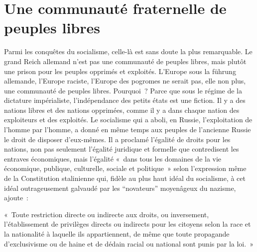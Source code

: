 \documentclass[french,twoside]{book} %
\newenvironment{quoteblock}%
  {\begin{quoting}}
  {\end{quoting}}
\newenvironment{quotebar}{%
    \def\FrameCommand{{\color{rubric!10!}\vrule width 0.5em} \hspace{0.9em}}%
    \def\OuterFrameSep{\itemsep} %
    \MakeFramed {\advance\hsize-\width \FrameRestore}
  }%
  {%
    \endMakeFramed
  }
\renewenvironment{quoteblock}%
  {%
    \savenotes
    \setstretch{0.9}
    \normalfont
    \begin{quotebar}
  }
  {%
    \end{quotebar}
    \spewnotes
  }
\begin{document}
\section[{Une communauté fraternelle de peuples libres}]{Une communauté fraternelle de peuples libres}
\noindent Parmi les conquêtes du socialisme, celle-là est sans doute la plus remarquable. Le grand Reich allemand n’est pas une communauté de peuples libres, mais plutôt une prison pour les peuples opprimés et exploités. L’Europe sous la führung allemande, l’Europe raciste, l’Europe des pogromes ne serait pas, elle non plus, une communauté de peuples libres. Pourquoi ? Parce que sous le régime de la dictature impérialiste, l’indépendance des petits états est une fiction. Il y a des nations libres et des nations opprimées, comme il y a dans chaque nation des exploiteurs et des exploités. Le socialisme qui a aboli, en Russie, l’exploitation de l’homme par l’homme, a donné en même temps aux peuples de l’ancienne Russie le droit de disposer d’eux-mêmes. Il a proclamé l’égalité de droits pour les nations, non pas seulement l’égalité juridique et formelle que contredisent les entraves économiques, mais l’égalité « dans tous les domaines de la vie économique, publique, culturelle, sociale et politique » selon l’expression même de la Constitution stalinienne qui, fidèle au plus haut idéal du socialisme, à cet idéal outrageusement galvaudé par les “novateurs” moyenâgeux du nazisme, ajoute :\par

\begin{quoteblock}
 \noindent « Toute restriction directe ou indirecte aux droits, ou inversement, l’établissement de privilèges directs ou indirects pour les citoyens selon la race et la nationalité à laquelle ils appartiennent, de même que toute propagande d’exclusivisme ou de haine et de dédain racial ou national sont punis par la loi. »
 \end{quoteblock}
\end{document}
